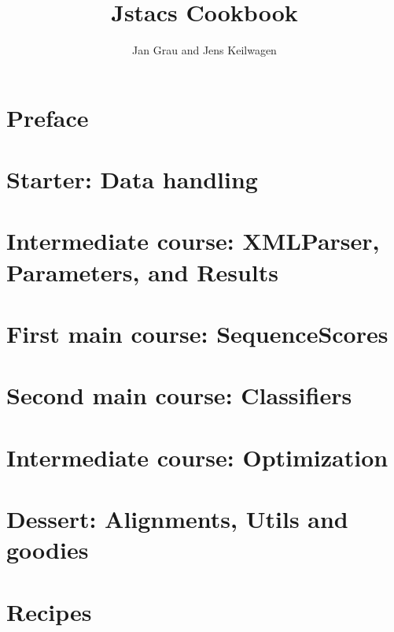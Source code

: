 \documentclass[a4paper,halfparskip]{scrartcl}
\author{Jan Grau and Jens Keilwagen}
\title{Jstacs Cookbook}
\begin{document}
\maketitle
\clearpage%

\tableofcontents
\clearpage

\section{Preface}
\clearpage

\section{Starter: Data handling}\label{data}

\clearpage

\section{Intermediate course: XMLParser, Parameters, and Results}\label{sec:xmlparres}

\clearpage

\section{First main course: SequenceScores}\label{sequenceScore}

\clearpage

\section{Second main course: Classifiers}\label{classifier}

\clearpage

\section{Intermediate course: Optimization}\label{Optimization}

\clearpage

\section{Dessert: Alignments, Utils and goodies}

\clearpage

\section{Recipes}

\end{document}
